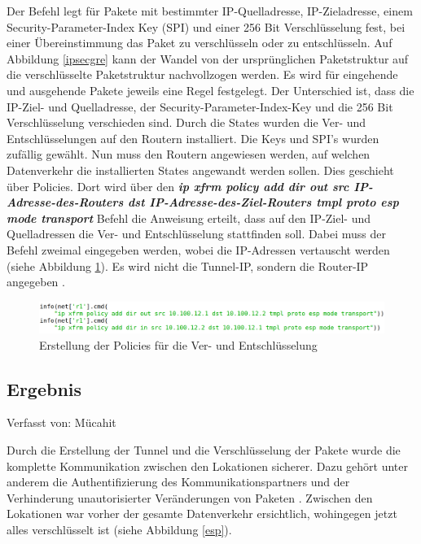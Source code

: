 \documentclass[fontsize=12pt,paper=a4,open=any,parskip=half,
  twoside=false,toc=listof,toc=bibliography,fleqn,leqno,
  captions=nooneline,captions=tableabove,british]{scrbook}
\begin{document}
Der Befehl legt für Pakete mit bestimmter IP-Quelladresse, IP-Zieladresse, einem Security-Parameter-Index Key (SPI) und einer 256 Bit Verschlüsselung fest, bei einer Übereinstimmung das Paket zu verschlüsseln oder zu entschlüsseln. Auf Abbildung \ref{ipsecgre} kann der Wandel von der ursprünglichen Paketstruktur auf die verschlüsselte Paketstruktur nachvollzogen werden. Es wird für eingehende und ausgehende Pakete jeweils eine Regel festgelegt. Der Unterschied ist, dass die IP-Ziel- und Quelladresse, der Security-Parameter-Index-Key und die 256 Bit Verschlüsselung verschieden sind. Durch die States wurden die Ver- und Entschlüsselungen auf den Routern installiert. Die Keys und SPI’s wurden zufällig gewählt. Nun muss den Routern angewiesen werden, auf welchen Datenverkehr die installierten States angewandt werden sollen. Dies geschieht über Policies. Dort wird über den \textit{\textbf{ip xfrm policy add dir out src IP-Adresse-des-Routers dst IP-Adresse-des-Ziel-Routers tmpl proto esp mode transport}} Befehl die Anweisung erteilt, dass auf den IP-Ziel- und Quelladressen die Ver- und Entschlüsselung stattfinden soll. Dabei muss der Befehl zweimal eingegeben werden, wobei die IP-Adressen vertauscht werden (siehe Abbildung \ref{policy}). Es wird nicht die Tunnel-IP, sondern die Router-IP angegeben \cite{xfrm}.

\begin{figure}[H]
 \centering
 \includegraphics[width=1.0\textwidth]{Bilder/policy}
 \captionsetup{justification=centering}
 \caption{Erstellung der Policies für die Ver- und Entschlüsselung}
 \label{policy}
\end{figure}

\subsection{Ergebnis}
{\tiny Verfasst von: Mücahit\par}
Durch die Erstellung der Tunnel und die Verschlüsselung der Pakete wurde die komplette Kommunikation zwischen den Lokationen sicherer. Dazu gehört unter anderem die Authentifizierung des Kommunikationspartners und der Verhinderung unautorisierter Veränderungen von Paketen \cite{espsecurity}. Zwischen den Lokationen war vorher der gesamte Datenverkehr ersichtlich, wohingegen jetzt alles verschlüsselt ist (siehe Abbildung \ref{esp}).
\end{document}
